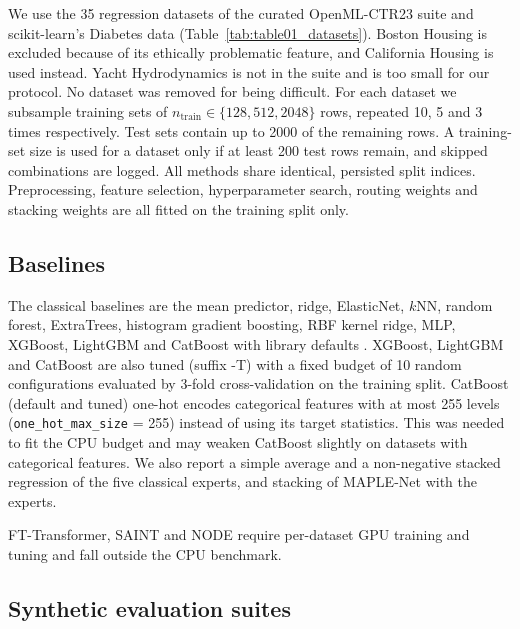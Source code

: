 \documentclass[mathematics,article,submit,pdftex,moreauthors]{Definitions/mdpi}
\begin{document}
We use the 35 regression datasets of the curated OpenML-CTR23 suite \cite{fischer2023openml,vanschoren2014openml,feurer2021openml} and scikit-learn's Diabetes data \cite{efron2004least} (Table~\ref{tab:table01_datasets}). Boston Housing is excluded because of its ethically problematic feature, and California Housing \cite{pace1997sparse} is used instead. Yacht Hydrodynamics is not in the suite and is too small for our protocol. No dataset was removed for being difficult. For each dataset we subsample training sets of $n_{\mathrm{train}}\in\{128,512,2048\}$ rows, repeated 10, 5 and 3 times respectively. Test sets contain up to 2000 of the remaining rows. A training-set size is used for a dataset only if at least 200 test rows remain, and skipped combinations are logged. All methods share identical, persisted split indices. Preprocessing, feature selection, hyperparameter search, routing weights and stacking weights are all fitted on the training split only.



\subsection{Baselines}

The classical baselines are the mean predictor, ridge, ElasticNet, $k$NN, random forest, ExtraTrees, histogram gradient boosting, RBF kernel ridge, MLP, XGBoost, LightGBM and CatBoost with library defaults \cite{hoerl1970ridge,zou2005regularization,breiman2001random,geurts2006extremely,chen2016xgboost,ke2017lightgbm,prokhorenkova2018catboost,pedregosa2011scikit}. XGBoost, LightGBM and CatBoost are also tuned (suffix -T) with a fixed budget of 10 random configurations evaluated by 3-fold cross-validation on the training split. CatBoost (default and tuned) one-hot encodes categorical features with at most 255 levels (\texttt{one\_hot\_max\_size} = 255) instead of using its target statistics. This was needed to fit the CPU budget and may weaken CatBoost slightly on datasets with categorical features. We also report a simple average and a non-negative stacked regression \cite{breiman1996stacked} of the five classical experts, and stacking of MAPLE-Net with the experts.

FT-Transformer, SAINT and NODE require per-dataset GPU training and tuning and fall outside the CPU benchmark.

\subsection{Synthetic evaluation suites}
\end{document}
